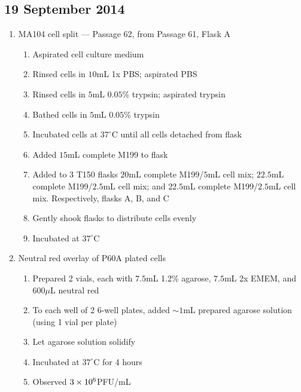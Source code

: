 \subsection*{19 September 2014}

\begin{enumerate}
	\item MA104 cell split --- Passage 62, from Passage 61, Flask A
		\begin{enumerate}
			\item Aspirated cell culture medium
			\item Rinsed cells in $10$mL 1x PBS; aspirated PBS
			\item Rinsed cells in $5$mL $0.05$\% trypsin; aspirated trypsin
			\item Bathed cells in $5$mL $0.05$\% trypsin
			\item Incubated cells at $37^{\circ}$C until all cells detached from flask
			\item Added $15$mL complete M199 to flask
			\item Added to $3$ T150 flasks $20$mL complete M199/$5$mL cell mix; $22.5$mL complete M199/$2.5$mL cell mix; and $22.5$mL complete M199/$2.5$mL cell mix. Respectively, flasks A, B, and C
			\item Gently shook flasks to distribute cells evenly
			\item Incubated at $37^{\circ}$C
		\end{enumerate}
	\item Neutral red overlay of P60A plated cells
		\begin{enumerate}
			\item Prepared 2 vials, each with $7.5$mL 1.2\% agarose, $7.5$mL 2x EMEM, and $600\mu$L neutral red
			\item To each well of 2 6-well plates, added $\sim 1$mL prepared agarose solution (using 1 vial per plate)
			\item Let agarose solution solidify
			\item Incubated at $37^{\circ}$C for 4 hours
			\item Observed $3\times 10^{6}$PFU/mL
		\end{enumerate}
\end{enumerate}